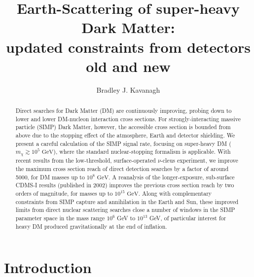 \documentclass[prd,twocolumn,showpacs,nofootinbib,aps]{revtex4-1}
\begin{document}
\title{Earth-Scattering of super-heavy Dark Matter: \\updated constraints from detectors old and new}
\author{Bradley J. Kavanagh}


\begin{abstract}
Direct searches for Dark Matter (DM) are continuously improving, probing down to lower and lower DM-nucleon interaction cross sections. For strongly-interacting massive particle (SIMP) Dark Matter, however, the accessible cross section is bounded from above due to the stopping effect of the atmosphere, Earth and detector shielding. We present a careful calculation of the SIMP signal rate, focusing on super-heavy DM ($m_\chi \gtrsim 10^5 \,\,\mathrm{GeV}$), where the standard nuclear-stopping formalism is applicable. With recent results from the low-threshold, surface-operated $\nu$-cleus experiment, we improve the maximum cross section reach of direct detection searches by a factor of around 5000, for DM masses up to $10^8 \,\,\mathrm{GeV}$. A reanalysis of the longer-exposure, sub-surface CDMS-I results (published in 2002) improves the previous cross section reach by two orders of magnitude, for masses up to $10^{15} \,\,\mathrm{GeV}$. Along with complementary constraints from SIMP capture and annihilation in the Earth and Sun, these improved limits from direct nuclear scattering searches close a number of windows in the SIMP parameter space in the mass range $10^6$ GeV to $10^{13}$ GeV, of particular interest for heavy DM produced gravitationally at the end of inflation.

 
\end{abstract}


\maketitle

\section{Introduction}
\label{sec:introduction}
\end{document}
